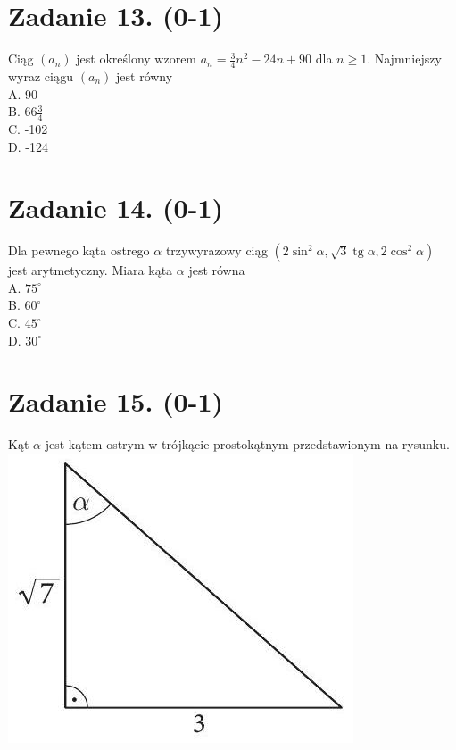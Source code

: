 \documentclass[10pt]{article}
\begin{document}
\section*{Zadanie 13. (0-1)}
Ciąg \(\left(a_{n}\right)\) jest określony wzorem \(a_{n}=\frac{3}{4} n^{2}-24 n+90\) dla \(n \geqslant 1\). Najmniejszy wyraz ciągu \(\left(a_{n}\right)\) jest równy\\
A. 90\\
B. \(66 \frac{3}{4}\)\\
C. -102\\
D. -124

\section*{Zadanie 14. (0-1)}
Dla pewnego kąta ostrego \(\alpha\) trzywyrazowy ciąg \(\left(2 \sin ^{2} \alpha, \sqrt{3} \operatorname{tg} \alpha, 2 \cos ^{2} \alpha\right)\) jest arytmetyczny. Miara kąta \(\alpha\) jest równa\\
A. \(75^{\circ}\)\\
B. \(60^{\circ}\)\\
C. \(45^{\circ}\)\\
D. \(30^{\circ}\)

\section*{Zadanie 15. (0-1)}
Kąt \(\alpha\) jest kątem ostrym w trójkącie prostokątnym przedstawionym na rysunku.\\
\includegraphics[max width=\textwidth, center]{2024_11_21_72158d4a4efa7dd894bcg-06}
\end{document}

